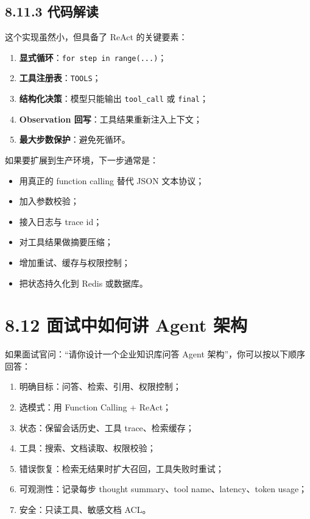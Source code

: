 
\subsection{8.11.3 代码解读}

这个实现虽然小，但具备了 ReAct 的关键要素：


\begin{enumerate}[leftmargin=2em]
\item \textbf{显式循环}：\texttt{for step in range(...)}；
\item \textbf{工具注册表}：\texttt{TOOLS}；
\item \textbf{结构化决策}：模型只能输出 \texttt{tool\_call} 或 \texttt{final}；
\item \textbf{Observation 回写}：工具结果重新注入上下文；
\item \textbf{最大步数保护}：避免死循环。
\end{enumerate}

如果要扩展到生产环境，下一步通常是：


\begin{itemize}[leftmargin=2em]
\item 用真正的 function calling 替代 JSON 文本协议；
\item 加入参数校验；
\item 接入日志与 trace id；
\item 对工具结果做摘要压缩；
\item 增加重试、缓存与权限控制；
\item 把状态持久化到 Redis 或数据库。
\end{itemize}

\section{8.12 面试中如何讲 Agent 架构}

如果面试官问：``请你设计一个企业知识库问答 Agent 架构''，你可以按以下顺序回答：


\begin{enumerate}[leftmargin=2em]
\item 明确目标：问答、检索、引用、权限控制；
\item 选模式：用 Function Calling + ReAct；
\item 状态：保留会话历史、工具 trace、检索缓存；
\item 工具：搜索、文档读取、权限校验；
\item 错误恢复：检索无结果时扩大召回，工具失败时重试；
\item 可观测性：记录每步 thought summary、tool name、latency、token usage；
\item 安全：只读工具、敏感文档 ACL。
\end{enumerate}

